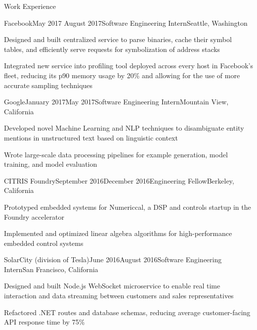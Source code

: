 \documentclass{resume} %
\begin{document}
\begin{rSection}{Work Experience}
\begin{rSubsection}{Facebook}{May 2017 \textminus August 2017}{Software Engineering Intern}{Seattle, Washington}
\item[] Designed and built centralized service to parse binaries, cache their symbol tables, and efficiently serve requests for symbolization of address stacks
\item[] Integrated new service into profiling tool deployed across every host in Facebook's fleet, reducing its p90 memory usage by 20\% and allowing for the use of more accurate sampling techniques
\end{rSubsection}
\begin{rSubsection}{Google}{January 2017\textminus May 2017}{Software Engineering Intern}{Mountain View, California}
\item[] Developed novel Machine Learning and NLP techniques to disambiguate entity mentions in unstructured text based on linguistic context
\item[] Wrote large-scale data processing pipelines for example generation, model training, and model evaluation
\end{rSubsection}
\begin{rSubsection}{CITRIS Foundry}{September 2016\textminus December 2016}{Engineering Fellow}{Berkeley, California}
\item[] Prototyped embedded systems for Numericcal, a DSP and controls startup in the Foundry accelerator
\item[] Implemented and optimized linear algebra algorithms for high-performance embedded control systems
\end{rSubsection}
\begin{rSubsection}{SolarCity (division of Tesla)}{June 2016\textminus August 2016}{Software Engineering Intern}{San Francisco, California}
\item[] Designed and built Node.js WebSocket microservice to enable real time interaction and data streaming between customers and sales representatives
\item[] Refactored .NET routes and database schemas, reducing average customer-facing API response time by 75\%
\end{rSubsection}
\end{rSection}
\end{document}
